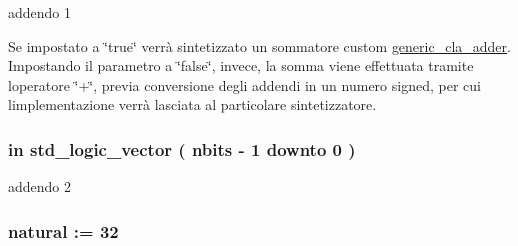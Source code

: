 addendo 1 

Se impostato a \char`\"{}true\char`\"{} verrà sintetizzato un sommatore custom \hyperlink{classgeneric__cla__adder}{generic\+\_\+cla\+\_\+adder}. Impostando il parametro a \char`\"{}false\char`\"{}, invece, la somma viene effettuata tramite l\textquotesingle{}operatore \char`\"{}+\char`\"{}, previa conversione degli addendi in un numero signed, per cui l\textquotesingle{}implementazione verrà lasciata al particolare sintetizzatore. 
\subsubsection[{\texorpdfstring{add2}{add2}}]{ {\bfseries \textcolor{vhdlchar}{in}\textcolor{vhdlchar}{ }} {\bfseries \textcolor{vhdlchar}{std\+\_\+logic\+\_\+vector}\textcolor{vhdlchar}{ }\textcolor{vhdlchar}{(}\textcolor{vhdlchar}{ }\textcolor{vhdlchar}{ }\textcolor{vhdlchar}{ }\textcolor{vhdlchar}{ }{\bfseries {\bf nbits}} \textcolor{vhdlchar}{-\/}\textcolor{vhdlchar}{ } \textcolor{vhdldigit}{1} \textcolor{vhdlchar}{ }\textcolor{vhdlchar}{downto}\textcolor{vhdlchar}{ }\textcolor{vhdlchar}{ } \textcolor{vhdldigit}{0} \textcolor{vhdlchar}{ }\textcolor{vhdlchar}{)}\textcolor{vhdlchar}{ }} \hspace{0.3cm}{\ttfamily [Port]}}\hypertarget{group___adder_gabf87ad241134c4d313c708910677575e}{}\label{group___adder_gabf87ad241134c4d313c708910677575e}


addendo 2 

\subsubsection[{\texorpdfstring{generic\+\_\+cla\+\_\+adder}{generic_cla_adder}}]{ {\bfseries \textcolor{vhdlchar}{ }} \hspace{0.3cm}{\ttfamily [Component]}}\hypertarget{group___adder_gae7148956d4ef1d1cd14f35060634b9c3}{}\label{group___adder_gae7148956d4ef1d1cd14f35060634b9c3}
\subsubsection[{\texorpdfstring{nbits}{nbits}}]{ {\bfseries \textcolor{vhdlchar}{ }} {\bfseries \textcolor{vhdlchar}{natural}\textcolor{vhdlchar}{ }\textcolor{vhdlchar}{ }\textcolor{vhdlchar}{\+:}\textcolor{vhdlchar}{=}\textcolor{vhdlchar}{ }\textcolor{vhdlchar}{ } \textcolor{vhdldigit}{32} \textcolor{vhdlchar}{ }} \hspace{0.3cm}{\ttfamily [Generic]}}\hypertarget{group___adder_gae1435c07d0cd54b521535e2f8de6f94e}{}\label{group___adder_gae1435c07d0cd54b521535e2f8de6f94e}
